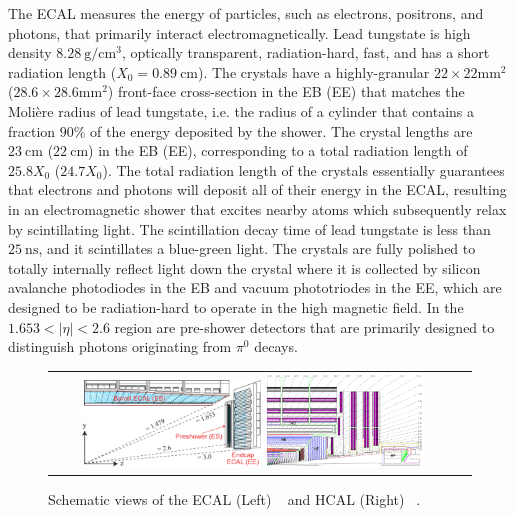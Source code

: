 The ECAL measures the energy of particles, such as electrons, positrons, and photons, that primarily interact electromagnetically.
Lead tungstate is high density $\SI{8.28}{\g\per\cm\cubed}$, optically transparent, radiation-hard, fast, and has a short radiation length ($X_0 = \SI{0.89}{\cm}$).
The crystals have a highly-granular $22 \times 22 \si{\mm\squared}$ ($28.6 \times 28.6 \si{\mm\squared}$) front-face cross-section in the EB (EE) that matches the Molière radius of lead tungstate, i.e. the radius of a cylinder that contains a fraction $90 \%$ of the energy deposited by the shower.
The crystal lengths are $\SI{23}{\cm}$ ($\SI{22}{\cm}$) in the EB (EE), corresponding to a total radiation length of $25.8X_0$ ($24.7X_0$).
The total radiation length of the crystals essentially guarantees that electrons and photons will deposit all of their energy in the ECAL, resulting in an electromagnetic shower that excites nearby atoms which subsequently relax by scintillating light.
The scintillation decay time of lead tungstate is less than $\SI{25}{\ns}$, and it scintillates a blue-green light.
The crystals are fully polished to totally internally reflect light down the crystal where it is collected by silicon avalanche photodiodes in the EB and vacuum phototriodes in the EE, which are designed to be radiation-hard to operate in the high magnetic field.
In the $1.653 < \vert \eta \vert < 2.6$ region are pre-shower detectors that are primarily designed to distinguish photons originating from $\pi^0$ decays.

\begin{figure}[htb]
  \begin{center}
    \begin{tabular}{cc}
        \includegraphics[width=0.45\textwidth]{fig_LHC_CMS/ECAL.pdf}
        \includegraphics[width=0.40\textwidth]{fig_LHC_CMS/HCAL.png}
    \end{tabular}
    \caption{Schematic views of the ECAL (Left) ~\cite{Bayatian:922757} and HCAL (Right) ~\cite{Chatrchyan:1129810}.
            }
    \label{ECAL_HCAL}
  \end{center}
\end{figure}

